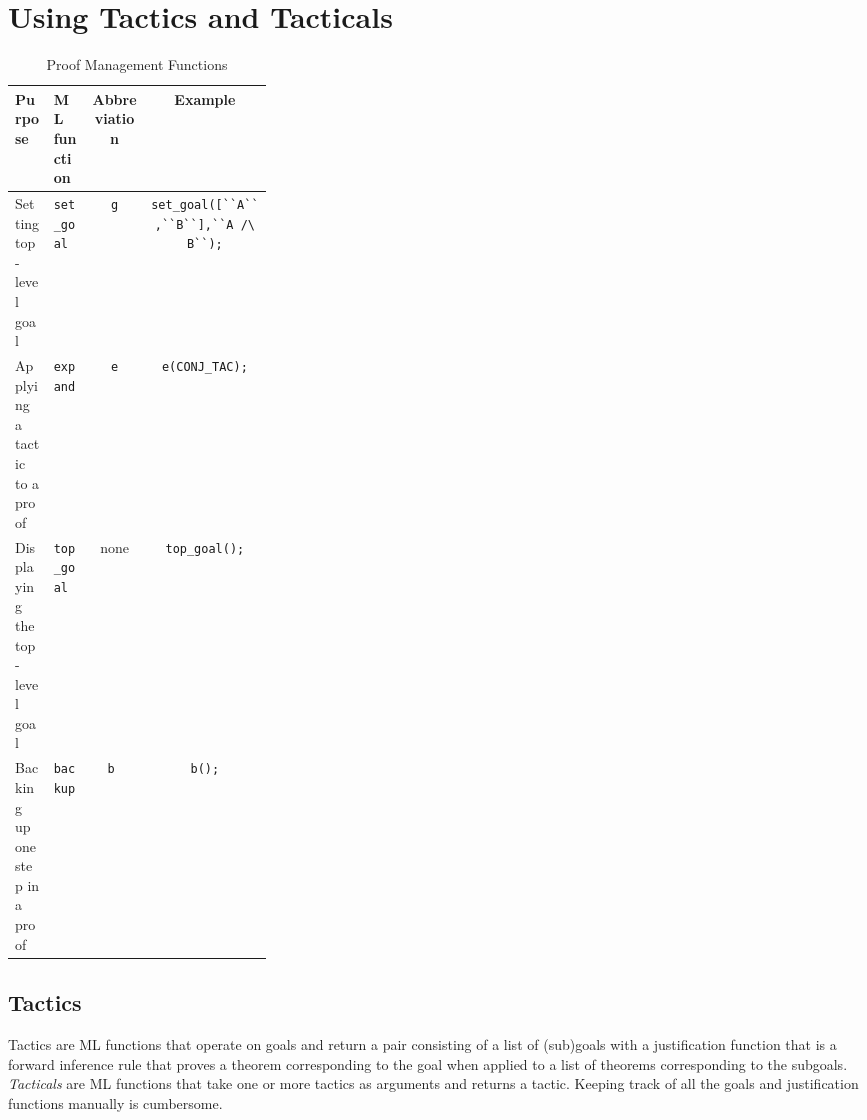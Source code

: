 \section{Using Tactics and Tacticals}

\begin{table}[t]
  \centering
  \begin{footnotesize}
    \begin{tabular}{|m{0.15\linewidth}|m{0.15\linewidth}|c|c|}
      \hline
      \textbf{Purpose} & \textbf{ML function} & \textbf{Abbreviation} & \textbf{Example}\\
      \hline
      Setting top-level goal & \verb|set_goal| & \texttt{g} 
      & \verb|set_goal([``A``,``B``],``A /\ B``);|\\
      \hline
      Applying a tactic to a proof & \texttt{expand} & \texttt{e} & \verb|e(CONJ_TAC);|\\
      \hline
      Displaying the top-level goal & \verb|top_goal| & none & \verb|top_goal();| \\
      \hline
      Backing up one step in a proof & \texttt{backup} & \texttt{b }& \texttt{b();}\\
      \hline
    \end{tabular}
  \end{footnotesize}

  \caption{Proof Management Functions}
  \label{tab:proof-management-functions}
\end{table}

\subsection{Tactics}

Tactics are ML functions that operate on goals and return a pair
consisting of a list of (sub)goals with a justification function that
is a forward inference rule that proves a theorem corresponding to the
goal when applied to a list of theorems corresponding to the subgoals.
\emph{Tacticals} are ML functions that take one or more tactics as
arguments and returns a tactic.  Keeping track of all the goals and
justification functions manually is cumbersome.  

